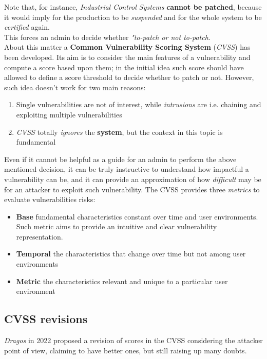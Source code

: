Note that, for instance, \textit{Industrial Control Systems} \textbf{cannot be patched}, because it would imply for the production to be \textit{suspended} and for the whole system to be \textit{certified} again.\\
This forces an admin to decide whether \textit{"to-patch or not to-patch}.\\
About this matter a \textbf{Common Vulnerability Scoring System} (\textit{CVSS}) has been developed.
Its aim is to consider the main features of a vulnerability and compute a score based upon them;
in the initial idea such score should have allowed to define a score threshold to decide whether to patch or not.
However, such idea doesn't work for two main reasons:
\begin{enumerate}
    \item Single vulnerabilities are not of interest, while \textit{intrusions} are i.e. chaining and exploiting multiple vulnerabilities
    \item \textit{CVSS} totally \textit{ignores} the \textbf{system}, but the context in this topic is fundamental 
\end{enumerate}
Even if it cannot be helpful as a guide for an admin to perform the above mentioned decision, it can be truly instructive to understand how impactful a vulnerability can be, 
and it can provide an approximation of how \textit{difficult} may be for an attacker to exploit such vulnerability.
The CVSS provides three \textit{metrics} to evaluate vulnerabilities risks:
\begin{itemize}
    \item \textbf{Base} fundamental characteristics constant over time and user environments.
    Such metric aims to provide an intuitive and clear vulnerability representation.
    \item \textbf{Temporal} the characteristics that change over time but not among user environments
    \item \textbf{Metric} the characteristics relevant and unique to a particular user environment
\end{itemize}


\subsection{CVSS revisions}
\textit{Dragos} in 2022 proposed a revision of scores in the CVSS considering the attacker point of view, claiming to have better ones,
but still raising up many doubts.

